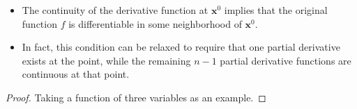 \documentclass[11pt]{../../TexTemplate/elegantbook}
\begin{document}
\begin{note}
    \begin{itemize}
        \item The continuity of the derivative function at \(\mathbf{x}^{0}\) implies that 
            the original function \(f\) is differentiable in some neighborhood of \(\mathbf{x}^{0}\).
        \item In fact, this condition can be relaxed to require that one partial derivative exists at the point, 
            while the remaining \(n-1\) partial derivative functions are continuous at that point.
    \end{itemize}
\end{note}

\begin{proof}
    Taking a function of three variables as an example.


\end{proof}
\end{document}
